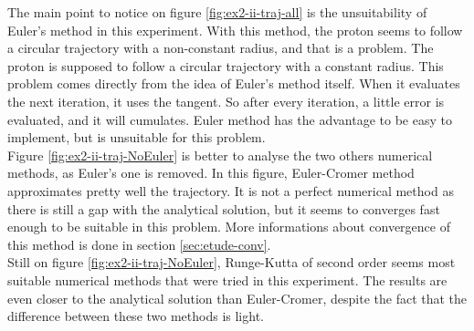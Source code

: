 \documentclass[a4paper,12pt,twoside]{article}
\begin{document}
The main point to notice on figure \ref{fig:ex2-ii-traj-all} is the unsuitability of Euler's method in this experiment.
With this method, the proton seems to follow a circular trajectory with a non-constant radius, and that is a problem.
The proton is supposed to follow a circular trajectory with a constant radius.
This problem comes directly from the idea of Euler's method itself.
When it evaluates the next iteration, it uses  the tangent. %
So after every iteration, a little error is evaluated, and it will cumulates.
Euler method has the advantage to be easy to implement, but is unsuitable for this problem.\\

Figure \ref{fig:ex2-ii-traj-NoEuler} is better to analyse the two others numerical methods, as Euler's one is removed.
In this figure, Euler-Cromer method approximates pretty well the trajectory.
It is not a perfect numerical method as there is still a gap with the analytical solution, but it seems to converges fast enough to be suitable in this problem.
More informations about convergence of this method is done in section \ref{sec:etude-conv}.\\

Still on figure \ref{fig:ex2-ii-traj-NoEuler}, Runge-Kutta of second order seems most suitable numerical methods that were tried in this experiment.
The results are even closer to the analytical solution than Euler-Cromer, despite the fact that the difference between these two methods is light.

\end{document}
